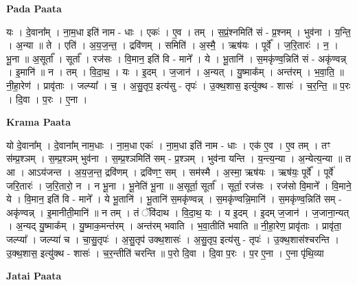 \documentclass[17pt]{extarticle}
\begin{document}
\textbf{Pada Paata} \newline

यः । दे॒वाना᳚म् । ना॒म॒धा इति॑ नाम - धाः । एकः॑ । ए॒व । तम् । स॒प्रं॒श्नमिति॑ सं - प्र॒श्नम् । भुव॑ना । य॒न्ति॒ । अ॒न्या ॥ ते । एति॑ । अ॒य॒ज॒न्त॒ । द्रवि॑णम् । समिति॑ । अ॒स्मै॒ । ऋष॑यः । पूर्वे᳚ । ज॒रि॒तारः॑ । न॒ । भू॒ना ॥ अ॒सूर्ता᳚ । सूर्ता᳚ । रज॑सः । वि॒मान॒ इति॑ वि - माने᳚ । ये । भू॒तानि॑ । स॒मकृ॑ण्व॒न्निति॑ सं - अकृ॑ण्वन्न् । इ॒मानि॑ ॥ न । तम् । वि॒दा॒थ॒ । यः । इ॒दम् । ज॒जान॑ । अ॒न्यत् । यु॒ष्माक᳚म् । अन्त॑रम् । भ॒वा॒ति॒ ॥ नी॒हा॒रेण॑ । प्रावृ॑ताः । जल्प्या᳚ । च॒ । अ॒सु॒तृप॒ इत्य॑सु - तृपः॑ । उ॒क्थ॒शास॒ इत्यु॑क्थ - शासः॑ । च॒र॒न्ति॒ ॥ प॒रः । दि॒वा । प॒रः । ए॒ना ।  \newline


\textbf{Krama Paata} \newline

यो दे॒वाना᳚म् । दे॒वाना᳚म् नाम॒धाः । ना॒म॒धा एकः॑ । ना॒म॒धा इति॑ नाम - धाः । एक॑ ए॒व । ए॒व तम् । तꣳ स॑म्प्र॒श्ञम् । स॒म्प्र॒श्ञम् भुव॑ना । स॒म्प्र॒श्ञमिति॑ सम् - प्र॒श्ञम् । भुव॑ना यन्ति । य॒न्त्य॒न्या । अ॒न्येत्य॒न्या ॥ त आ । आऽय॑जन्त । अ॒य॒ज॒न्त॒ द्रवि॑णम् । द्रवि॑णꣳ॒॒ सम् । सम॑स्मै । अ॒स्मा॒ ऋष॑यः । ऋष॑यः॒ पूर्वे᳚ । पूर्वे॑ जरि॒तारः॑ । ज॒रि॒तारो॒ न । न भू॒ना । भू॒नेति॑ भू॒ना ॥ अ॒सूर्ता॒ सूर्ता᳚ । सूर्ता॒ रज॑सः । रज॑सो वि॒माने᳚ । वि॒माने॒ ये । वि॒मान॒ इति॑ वि - माने᳚ । ये भू॒तानि॑ । भू॒तानि॑ स॒मकृ॑ण्वन्न् । स॒मकृ॑ण्वन्नि॒मानि॑ । स॒मकृ॑ण्व॒न्निति॑ सम् - अकृ॑ण्वन्न् । इ॒मानीती॒मानि॑ ॥ न तम् । तं ॅवि॑दाथ । वि॒दा॒थ॒ यः । य इ॒दम् । इ॒दम् ज॒जान॑ । ज॒जाना॒न्यत् । अ॒न्यद् यु॒ष्माक᳚म् । यु॒ष्माक॒मन्त॑रम् । अन्त॑रम् भवाति । भ॒वा॒तीति॑ भवाति ॥ नी॒हा॒रेण॒ प्रावृ॑ताः । प्रावृ॑ता॒ जल्प्या᳚ । जल्प्या॑ च । चा॒सु॒तृपः॑ । अ॒सु॒तृप॑ उक्थ॒शासः॑ । अ॒सु॒तृप॒ इत्य॑सु - तृपः॑ । उ॒क्थ॒शास॑श्चरन्ति । उ॒क्थ॒शास॒ इत्यु॑क्थ - शासः॑ । च॒र॒न्तीति॑ चरन्ति ॥ प॒रो दि॒वा । दि॒वा प॒रः । प॒र ए॒ना । ए॒ना पृ॑थि॒व्या \newline

\textbf{Jatai Paata} \newline
\end{document}
